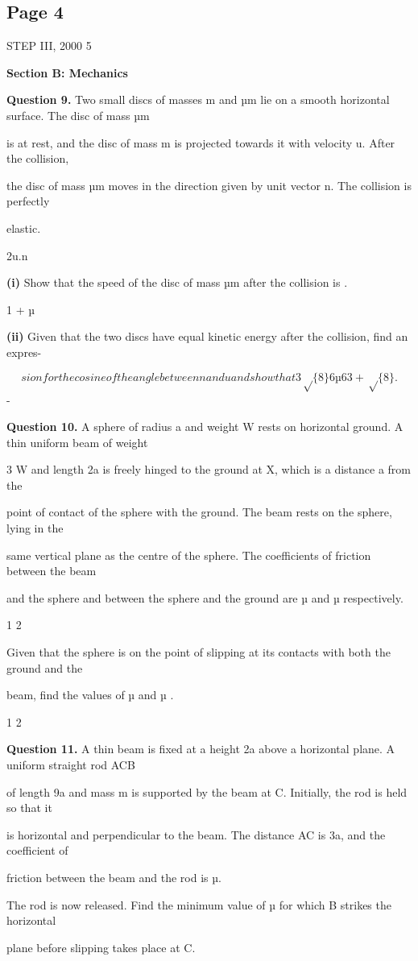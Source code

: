 \documentclass[12pt]{article}
\begin{document}
\subsection*{Page 4}
\begin{flushleft}
STEP III, 2000 5\par
\bigskip\textbf{Section B: Mechanics}\par
\bigskip\textbf{Question 9.} Two small discs of masses m and µm lie on a smooth horizontal surface. The disc of mass µm\par
is at rest, and the disc of mass m is projected towards it with velocity u. After the collision,\par
the disc of mass µm moves in the direction given by unit vector n. The collision is perfectly\par
elastic.\par
2u.n\par
\textbf{(i)} Show that the speed of the disc of mass µm after the collision is .\par
1 + µ\par
\textbf{(ii)} Given that the two discs have equal kinetic energy after the collision, find an expres-\par
\[sion for the cosine of the angle between n and u and show that 3 \sqrt\{8\} 6 µ 6 3 + \sqrt\{8\}.\]
-\par
\bigskip\textbf{Question 10.} A sphere of radius a and weight W rests on horizontal ground. A thin uniform beam of weight\par
3 W and length 2a is freely hinged to the ground at X, which is a distance  a from the\par
point of contact of the sphere with the ground. The beam rests on the sphere, lying in the\par
same vertical plane as the centre of the sphere. The coefficients of friction between the beam\par
and the sphere and between the sphere and the ground are µ and µ respectively.\par
1 2\par
Given that the sphere is on the point of slipping at its contacts with both the ground and the\par
beam, find the values of µ and µ .\par
1 2\par
\bigskip\textbf{Question 11.} A thin beam is fixed at a height 2a above a horizontal plane. A uniform straight rod ACB\par
of length 9a and mass m is supported by the beam at C. Initially, the rod is held so that it\par
is horizontal and perpendicular to the beam. The distance AC is 3a, and the coefficient of\par
friction between the beam and the rod is µ.\par
The rod is now released. Find the minimum value of µ for which B strikes the horizontal\par
plane before slipping takes place at C.\par
\end{flushleft}
\end{document}
